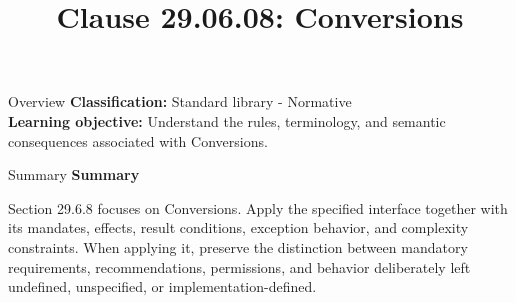 \documentclass[10pt,letterpaper]{article}
\title{Clause 29.06.08: Conversions}
\author{}
\date{}
\begin{document}
\maketitle
\begin{CornellOverviewBox}{Overview}
\textbf{Classification:} Standard library - Normative\\[2pt]
\textbf{Learning objective:} Understand the rules, terminology, and semantic consequences associated with Conversions.
\end{CornellOverviewBox}\begin{CornellSummaryBox}{Summary}
{\sffamily\bfseries\color{Accent} Summary}\par\vspace{3pt}Section 29.6.8 focuses on Conversions. Apply the specified interface together with its mandates, effects, result conditions, exception behavior, and complexity constraints. When applying it, preserve the distinction between mandatory requirements, recommendations, permissions, and behavior deliberately left undefined, unspecified, or implementation-defined.
\end{CornellSummaryBox}
\end{document}
